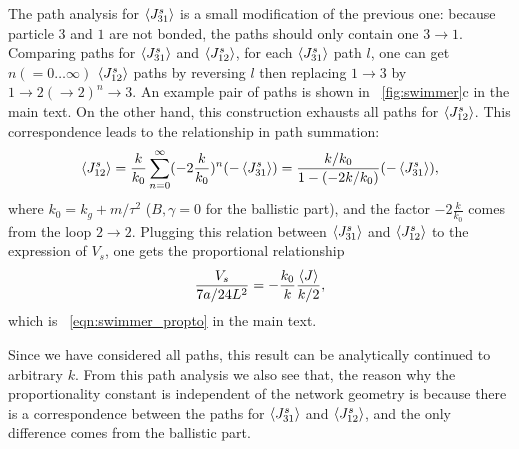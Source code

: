 \documentclass[
 amsmath,amssymb,
 aps,
 pre,
 longbibliography,
 10pt, onecolumn,
 notitlepage
]{revtex4-1}
\begin{document}
The path analysis for $\expval{J_{31}^s}$ is a small modification of the previous one: because particle $3$ and $1$ are not bonded, the paths should only contain one $3\rightarrow 1$.
Comparing paths for $\expval{J_{31}^s}$ and $\expval{J_{12}^s}$, for each $\expval{J_{31}^s}$ path $l$, one can get $n (=0\dots \infty)$ $\expval{J_{12}^s}$ paths by reversing $l$ then replacing $1\rightarrow 3$ by $1\rightarrow 2(\rightarrow 2)^n \rightarrow 3$. An example pair of paths is shown in \figurename~\ref{fig:swimmer}c in the main text.
On the other hand, this construction exhausts all paths for $\expval{J_{12}^s}$. This correspondence leads to the relationship in path summation:
\begin{equation}
    \expval{J_{12}^s} = \frac{k}{k_0}\sum_{n=0}^\infty (-2\frac{k}{k_0})^n (-\expval{J_{31}^s}) = \frac{k/k_0}{1-(-2k/k_0)} (-\expval{J_{31}^s}),
\end{equation}
where $k_0 = k_g + m/\tau^2$ ($B,\gamma=0$ for the ballistic part), and the factor $-2\frac{k}{k_0}$ comes from the loop $2\rightarrow 2$.
Plugging this relation between $\expval{J_{31}^s}$ and $\expval{J_{12}^s}$ to the expression of $V_s$, one gets the proportional relationship
\begin{equation}
    \frac{V_s}{7a/24L^2} = -\frac{k_0}{k} \frac{\expval{J}}{k/2},
\end{equation}
which is \eqnname~\eqref{eqn:swimmer_propto} in the main text.

Since we have considered all paths, this result can be analytically continued to arbitrary $k$.
From this path analysis we also see that, the reason why the proportionality constant is independent of the network geometry is because there is a correspondence between the paths for $\expval{J_{31}^s}$ and $\expval{J_{12}^s}$, and the only difference comes from the ballistic part.



\end{document}
